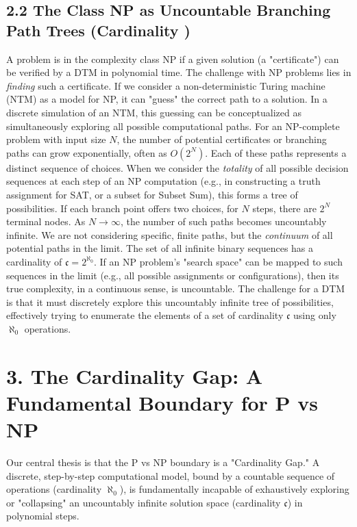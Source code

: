 \documentclass[11pt,twocolumn]{article}
\begin{document}
\subsection{2.2 The Class NP as Uncountable Branching Path Trees (Cardinality )}
A problem is in the complexity class NP if a given solution (a "certificate") can be verified by a DTM in polynomial time. The challenge with NP problems lies in \textit{finding} such a certificate. If we consider a non-deterministic Turing machine (NTM) as a model for NP, it can "guess" the correct path to a solution. In a discrete simulation of an NTM, this guessing can be conceptualized as simultaneously exploring all possible computational paths.
For an NP-complete problem with input size $N$, the number of potential certificates or branching paths can grow exponentially, often as $O(2^N)$. Each of these paths represents a distinct sequence of choices. When we consider the \textit{totality} of all possible decision sequences at each step of an NP computation (e.g., in constructing a truth assignment for SAT, or a subset for Subset Sum), this forms a tree of possibilities.
If each branch point offers two choices, for $N$ steps, there are $2^N$ terminal nodes. As $N \to \infty$, the number of such paths becomes uncountably infinite. We are not considering specific, finite paths, but the \textit{continuum} of all potential paths in the limit.
The set of all infinite binary sequences has a cardinality of $\mathfrak{c} = 2^{\aleph_0}$. If an NP problem's "search space" can be mapped to such sequences in the limit (e.g., all possible assignments or configurations), then its true complexity, in a continuous sense, is uncountable. The challenge for a DTM is that it must discretely explore this uncountably infinite tree of possibilities, effectively trying to enumerate the elements of a set of cardinality $\mathfrak{c}$ using only $\aleph_0$ operations.

\section{3. The Cardinality Gap: A Fundamental Boundary for P vs NP}
Our central thesis is that the P vs NP boundary is a "Cardinality Gap." A discrete, step-by-step computational model, bound by a countable sequence of operations (cardinality $\aleph_0$), is fundamentally incapable of exhaustively exploring or "collapsing" an uncountably infinite solution space (cardinality $\mathfrak{c}$) in polynomial steps.
\end{document}
